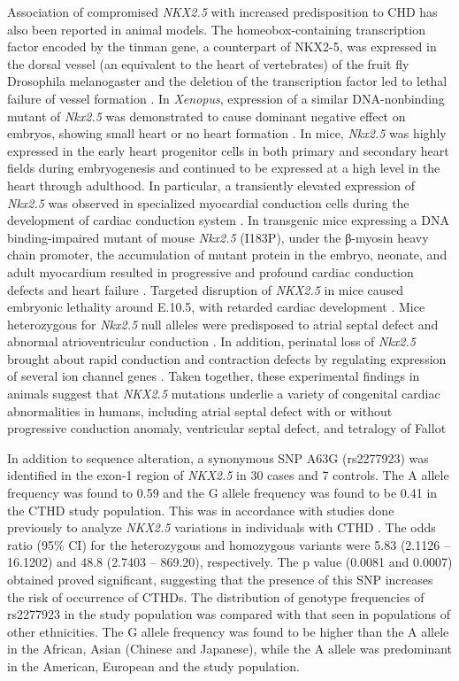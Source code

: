 \begin{refsection}
Association of compromised \textit{NKX2.5} with increased predisposition to CHD has also been reported in animal models. The homeobox-containing transcription factor encoded by the tinman gene, a counterpart of NKX2-5, was expressed in the dorsal vessel (an equivalent to the heart of vertebrates) of the fruit fly Drosophila melanogaster and the deletion of the transcription factor led to lethal failure of vessel formation \cite{benson1999mutations}. In \textit{Xenopus}, expression of a similar DNA-nonbinding mutant of \textit{Nkx2.5} was demonstrated to cause dominant negative effect on embryos, showing small heart or no heart formation \cite{grow1998tinman}. In mice, \textit{Nkx2.5} was highly expressed in the early heart progenitor cells in both primary and secondary heart fields during embryogenesis and continued to be expressed at a high level in the heart through adulthood. In particular, a transiently elevated expression of \textit{Nkx2.5} was observed in specialized myocardial conduction cells during the development of cardiac conduction system \cite{akazawa2005cardiac}. In transgenic mice expressing a DNA binding-impaired mutant of mouse \textit{Nkx2.5} (I183P), under the β-myosin heavy chain promoter, the accumulation of mutant protein in the embryo, neonate, and adult myocardium resulted in progressive and profound cardiac conduction defects and heart failure \cite{kasahara2001progressive}. Targeted disruption of \textit{NKX2.5} in mice caused embryonic lethality around E.10.5, with retarded cardiac development \cite{lyons1995myogenic,tanaka1999cardiac}. Mice heterozygous for \textit{Nkx2.5} null alleles were predisposed to atrial septal defect and abnormal atrioventricular conduction \cite{biben2000cardiac}. In addition, perinatal loss of \textit{Nkx2.5} brought about rapid conduction and contraction defects by regulating expression of several ion channel genes \cite{briggs2008perinatal}. Taken together, these experimental findings in animals suggest that \textit{NKX2.5} mutations underlie a variety of congenital cardiac abnormalities in humans, including atrial septal defect with or without progressive conduction anomaly, ventricular septal defect, and tetralogy of Fallot

In addition to sequence alteration, a synonymous SNP A63G (rs2277923) was identified in the exon-1 region of \textit{NKX2.5} in 30 cases and 7 controls. The A allele frequency was found to 0.59 and the G allele frequency was found to be 0.41 in the CTHD study population. This was in accordance with studies done previously to analyze \textit{NKX2.5} variations in individuals with CTHD \cite{reamon2004somatic}. The odds ratio (95\% CI) for the heterozygous and homozygous variants were 5.83 (2.1126 – 16.1202) and 48.8 (2.7403 – 869.20), respectively. The p value (0.0081 and 0.0007) obtained proved significant, suggesting that the presence of this SNP increases the risk of occurrence of CTHDs. The distribution of genotype frequencies of rs2277923 in the study population was compared with that seen in populations of other ethnicities. The G allele frequency was found to be higher than the A allele in the African, Asian (Chinese and Japanese), while the A allele was predominant in the American, European and the study population.


\end{refsection}
